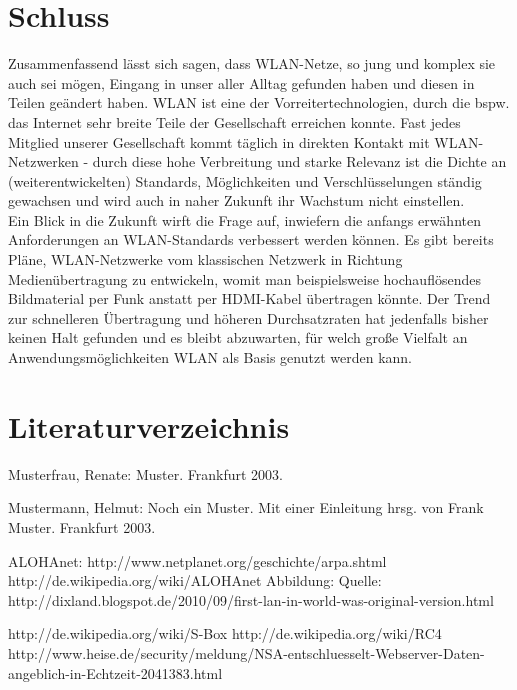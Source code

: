 \documentclass[a4paper,13pt]{scrartcl}
\begin{document}
\section{Schluss}
Zusammenfassend lässt sich sagen, dass WLAN-Netze, so jung und komplex sie auch sei mögen, Eingang in unser aller Alltag gefunden haben und diesen in Teilen geändert haben. WLAN ist eine der Vorreitertechnologien, durch die bspw. das Internet sehr breite Teile der Gesellschaft erreichen konnte. Fast jedes Mitglied unserer Gesellschaft kommt täglich in direkten Kontakt mit WLAN-Netzwerken - durch diese hohe Verbreitung und starke Relevanz ist die Dichte an (weiterentwickelten) Standards, Möglichkeiten und Verschlüsselungen ständig gewachsen und wird auch in naher Zukunft ihr Wachstum nicht einstellen.\\
Ein Blick in die Zukunft wirft die Frage auf, inwiefern die anfangs erwähnten Anforderungen an WLAN-Standards verbessert werden können. Es gibt bereits Pläne, WLAN-Netzwerke vom klassischen Netzwerk in Richtung Medienübertragung zu entwickeln, womit man beispielsweise hochauflösendes Bildmaterial per Funk anstatt per HDMI-Kabel übertragen könnte. Der Trend zur schnelleren Übertragung und höheren Durchsatzraten hat jedenfalls bisher keinen Halt gefunden und es bleibt abzuwarten, für welch große Vielfalt an Anwendungsmöglichkeiten WLAN als Basis genutzt werden kann.

\clearpage

\section{Literaturverzeichnis}

Musterfrau, Renate: Muster. Frankfurt 2003.


Mustermann, Helmut: Noch ein Muster. Mit einer Einleitung hrsg. von Frank Muster. Frankfurt 2003.

ALOHAnet: http://www.netplanet.org/geschichte/arpa.shtml
http://de.wikipedia.org/wiki/ALOHAnet
Abbildung: Quelle: http://dixland.blogspot.de/2010/09/first-lan-in-world-was-original-version.html

http://de.wikipedia.org/wiki/S-Box
http://de.wikipedia.org/wiki/RC4
http://www.heise.de/security/meldung/NSA-entschluesselt-Webserver-Daten-angeblich-in-Echtzeit-2041383.html
\end{document}
